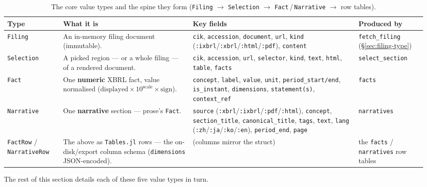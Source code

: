 \documentclass[11pt,a4paper]{report}
\begin{document}
\begin{table}[h]
\centering
\small
\caption{The core value types and the spine they form (\texttt{Filing} \(\to\) \texttt{Selection} \(\to\)
\texttt{Fact}\,/\,\texttt{Narrative} \(\to\) row tables).}
\label{tab:coretypes}
\begin{tabular}{@{}p{}p{}p{}p{}@{}}
\toprule
\textbf{Type} & \textbf{What it is} & \textbf{Key fields} & \textbf{Produced by} \\
\midrule
\texttt{Filing} & An in-memory filing document (immutable). & \texttt{cik}, \texttt{accession},
  \texttt{document}, \texttt{url}, \texttt{kind} (\texttt{:ixbrl}/\texttt{:xbrl}/\texttt{:html}/\texttt{:pdf}),
  \texttt{content} & \texttt{fetch\_filing} (\S\ref{sec:filing-type}) \\
\texttt{Selection} & A picked region --- or a whole filing --- of a rendered document. & \texttt{cik},
  \texttt{accession}, \texttt{url}, \texttt{selector}, \texttt{kind}, \texttt{text}, \texttt{html},
  \texttt{table}, \texttt{facts} & \texttt{select\_section} \\
\texttt{Fact} & One \textbf{numeric} XBRL fact, value normalised (\(\mathrm{displayed}\times10^{\mathrm{scale}}\times\mathrm{sign}\)). &
  \texttt{concept}, \texttt{label}, \texttt{value}, \texttt{unit}, \texttt{period\_start/end},
  \texttt{is\_instant}, \texttt{dimensions}, \texttt{statement(s)}, \texttt{context\_ref} & \texttt{facts} \\
\texttt{Narrative} & One \textbf{narrative} section --- prose's \texttt{Fact}. & \texttt{source}
  (\texttt{:xbrl}/\texttt{:ixbrl}/\texttt{:pdf}/\texttt{:html}), \texttt{concept}, \texttt{section\_title},
  \texttt{canonical\_title}, \texttt{tags}, \texttt{text}, \texttt{lang}
  (\texttt{:zh}/\texttt{:ja}/\texttt{:ko}/\texttt{:en}), \texttt{period\_end}, \texttt{page} &
  \texttt{narratives} \\
\texttt{FactRow} / \texttt{NarrativeRow} & The above as \texttt{Tables.jl} rows --- the on-disk/export column
  schema (\texttt{dimensions} JSON-encoded). & (columns mirror the struct) & the \texttt{facts} /
  \texttt{narratives} row tables \\
\bottomrule
\end{tabular}
\end{table}

\noindent The rest of this section details each of these five value types in turn.
\end{document}
